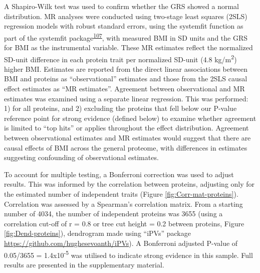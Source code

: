 \documentclass[11pt,twoside]{bristolthesis}
\begin{document}
A Shapiro-Wilk test was used to confirm whether the GRS showed a normal distribution. MR analyses were conducted using two-stage least squares (2SLS) regression models with robust standard errors, using the systemfit function as part of the systemfit package\textsuperscript{\protect\hyperlink{ref-Henningsen2007}{107}}, with measured BMI in SD units and the GRS for BMI as the instrumental variable. These MR estimates reflect the normalized SD-unit difference in each protein trait per normalized SD-unit (4.8 kg/m\textsuperscript{2}) higher BMI. Estimates are reported from the direct linear associations between BMI and proteins as ``observational'' estimates and those from the 2SLS causal effect estimates as ``MR estimates''. Agreement between observational and MR estimates was examined using a separate linear regression. This was performed: 1) for all proteins, and 2) excluding the proteins that fell below our P-value reference point for strong evidence (defined below) to examine whether agreement is limited to ``top hits'' or applies throughout the effect distribution. Agreement between observational estimates and MR estimates would suggest that there are causal effects of BMI across the general proteome, with differences in estimates suggesting confounding of observational estimates.

To account for multiple testing, a Bonferroni correction was used to adjust results. This was informed by the correlation between proteins, adjusting only for the estimated number of independent traits (Figure \ref{fig:Corr-mat-proteins}). Correlation was assessed by a Spearman's correlation matrix. From a starting number of 4034, the number of independent proteins was 3655 (using a correlation cut-off of r = 0.8 or tree cut height = 0.2 between proteins, Figure \ref{fig:Dend-proteins}), dendrogram made using ``iPVs'' package \url{https://github.com/hughesevoanth/iPVs}). A Bonferroni adjusted P-value of 0.05/3655 = 1.4x10\textsuperscript{-5} was utilised to indicate strong evidence in this sample. Full results are presented in the supplementary material.
\end{document}
